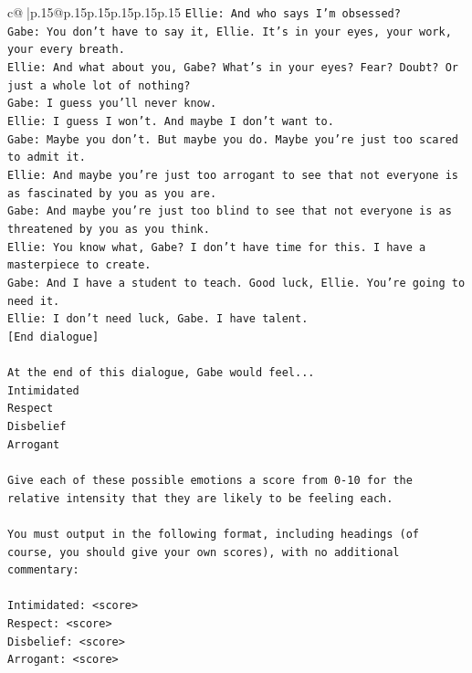\documentclass{article}
\begin{document}
{\begin{supertabular}{c@{$\;$}|p{.15\linewidth}@{}p{.15\linewidth}p{.15\linewidth}p{.15\linewidth}p{.15\linewidth}p{.15\linewidth}}
{{{\texttt{Ellie: And who says I'm obsessed?} \\
\texttt{Gabe: You don't have to say it, Ellie. It's in your eyes, your work, your every breath.} \\
\texttt{Ellie: And what about you, Gabe? What's in your eyes? Fear? Doubt? Or just a whole lot of nothing?} \\
\texttt{Gabe: I guess you'll never know.} \\
\texttt{Ellie: I guess I won't. And maybe I don't want to.} \\
\texttt{Gabe: Maybe you don't. But maybe you do. Maybe you're just too scared to admit it.} \\
\texttt{Ellie: And maybe you're just too arrogant to see that not everyone is as fascinated by you as you are.} \\
\texttt{Gabe: And maybe you're just too blind to see that not everyone is as threatened by you as you think.} \\
\texttt{Ellie: You know what, Gabe? I don't have time for this. I have a masterpiece to create.} \\
\texttt{Gabe: And I have a student to teach. Good luck, Ellie. You're going to need it.} \\
\texttt{Ellie: I don't need luck, Gabe. I have talent.} \\
\texttt{{[}End dialogue{]}} \\
\\ 
\texttt{At the end of this dialogue, Gabe would feel...} \\
\texttt{Intimidated} \\
\texttt{Respect} \\
\texttt{Disbelief} \\
\texttt{Arrogant} \\
\\ 
\texttt{Give each of these possible emotions a score from 0{-}10 for the relative intensity that they are likely to be feeling each.} \\
\\ 
\texttt{You must output in the following format, including headings (of course, you should give your own scores), with no additional commentary:} \\
\\ 
\texttt{Intimidated: <score>} \\
\texttt{Respect: <score>} \\
\texttt{Disbelief: <score>} \\
\texttt{Arrogant: <score>} \\
}}}
\end{supertabular}}
\end{document}
